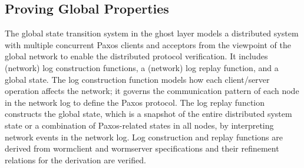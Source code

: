 \subsection{Proving Global Properties}
\label{subsec:safety_verification}

	The global state transition system in the ghost layer models a distributed system with multiple concurrent Paxos clients and acceptors from the viewpoint of the global network to enable the distributed protocol verification. It includes (network) log construction functions, a (network) log replay function, and a global state. The log construction function models how each client/server operation affects the network; it governs the communication pattern of each node in the network log to define the Paxos protocol. The log replay function constructs the global state, which is a snapshot of the entire distributed system state or a combination of Paxos-related states in all nodes, by interpreting network events in the network log. Log construction and replay functions are derived from wormclient and wormserver specifications and their refinement relations for the derivation are verified. 

